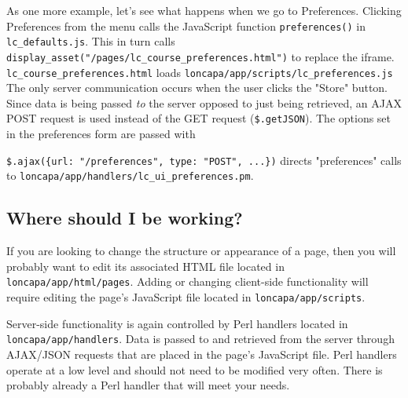 As one more example, let's see what happens when we go to Preferences.  Clicking Preferences from the menu calls the JavaScript function {\tt preferences()} in {\tt lc\_defaults.js}.  This in turn calls {\tt display\_asset("/pages/lc\_course\_preferences.html")} to replace the iframe.  {\tt lc\_course\_preferences.html} loads {\tt loncapa/app/scripts/lc\_preferences.js}  The only server communication occurs when the user clicks the "Store" button.  Since data is being passed {\it to} the server opposed to just being retrieved, an AJAX POST request is used instead of the GET request ({\tt \$.getJSON}).  The options set in the preferences form are passed with 

{\tt \$.ajax(\{url: "/preferences", type: "POST", ...\})}  directs "preferences" calls to {\tt loncapa/app/handlers/lc\_ui\_preferences.pm}.


\subsection{Where should I be working?}
If you are looking to change the structure or appearance of a page, then you will probably want to edit its associated HTML file located in {\tt loncapa/app/html/pages}.  Adding or changing client-side functionality will require editing the page's JavaScript file located in {\tt loncapa/app/scripts}.

Server-side functionality is again controlled by Perl handlers located in {\tt loncapa/app/handlers}.  Data is passed to and retrieved from the server through AJAX/JSON requests that are placed in the page's JavaScript file.  Perl handlers operate at a low level and should not need to be modified very often.  There is probably already a Perl handler that will meet your needs.
